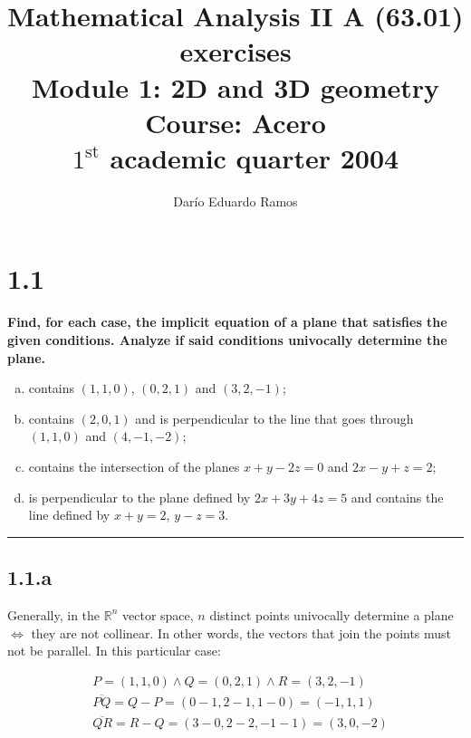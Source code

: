 \documentclass{article}
\title{Mathematical Analysis II A (63.01) exercises \\
Module 1: 2D and 3D geometry \\
Course: Acero \\
$1^{\text{st}}$ academic quarter 2004}
\author{Darío Eduardo Ramos}
\renewcommand{\Bbb}{\mathbb}
\begin{document}
\maketitle

\tableofcontents{}

\newpage

\section*{1.1}
\label{sec:1.1}

\textbf{Find, for each case, the implicit equation of a plane that satisfies the given conditions. Analyze if said conditions univocally determine the plane.} 

\begin{enumerate}[(a)]
\bfseries
\item contains $(1, 1, 0)$, $(0, 2, 1)$ and $(3, 2, -1)$;

\item contains $(2, 0, 1)$ and is perpendicular to the line that goes through $(1, 1, 0)$ and $(4, -1, -2)$;

\item contains the intersection of the planes $x + y - 2z = 0$ and $2x - y + z = 2$;

\item is perpendicular to the plane defined by $2x + 3y + 4z = 5$ and contains the line defined by $x + y = 2$, $y - z = 3$.
\end{enumerate}
\hrule

\subsection*{1.1.a}
\label{subsec:1.1.a}

Generally, in the $\Bbb R^n$ vector space, $n$ distinct points univocally determine a plane $\Leftrightarrow$ they are not collinear. In other words, the vectors that join the points must not be parallel. In this particular case:

\begin{subequations}
\begin{align}
& P = (1, 1, 0) \wedge Q = (0, 2, 1) \wedge R = (3, 2, -1) \\
& \overline{PQ} = Q - P = (0-1, 2-1, 1-0) = (-1, 1, 1) \\
& \overline{QR} = R - Q = (3-0, 2-2, -1-1) = (3, 0, -2)
\end{align}
\end{subequations}
\end{document}
